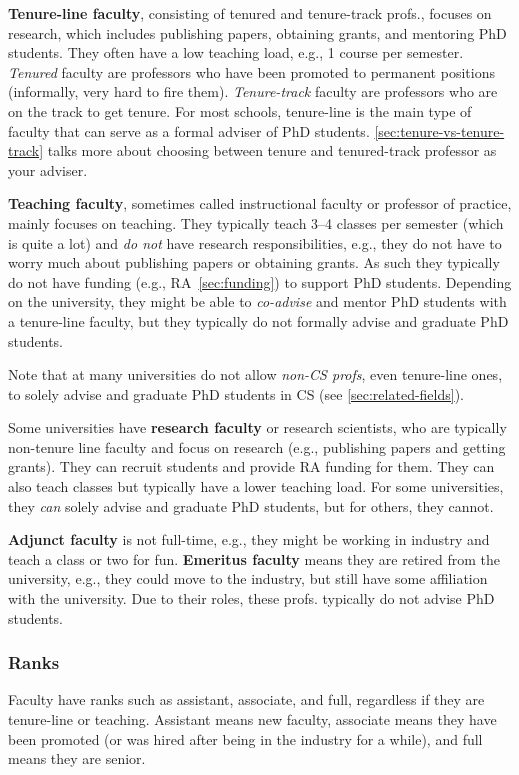 \documentclass[oneside,11pt,dvipsnames]{book}
\begin{document}
\textbf{Tenure-line faculty}, consisting of tenured and tenure-track profs., focuses on research, which includes publishing papers, obtaining grants, and mentoring PhD students.  They often have a low teaching load, e.g., 1 course per semester. \emph{Tenured} faculty are professors who have been promoted to permanent positions (informally, very hard to fire them).  \emph{Tenure-track} faculty are professors who are on the track to get tenure.  For most schools, tenure-line is the main type of faculty that can serve as a formal adviser of PhD students. \autoref{sec:tenure-vs-tenure-track} talks more about choosing between tenure and tenured-track professor as your adviser.

\textbf{Teaching faculty}, sometimes called instructional faculty or professor of practice, mainly focuses on teaching. They typically teach 3--4 classes per semester (which is quite a lot) and \emph{do not} have research responsibilities, e.g., they do not have to worry much about publishing papers or obtaining grants. As such they typically do not have funding (e.g., RA~\autoref{sec:funding}) to support PhD students.
Depending on the university, they might be able to \emph{co-advise} and mentor PhD students with a tenure-line faculty, but they typically do not formally advise and graduate PhD students.

Note that at many universities do not allow \emph{non-CS profs}, even tenure-line ones, to solely advise and graduate PhD students in CS (see \autoref{sec:related-fields}). 

Some universities have \textbf{research faculty} or research scientists, who are typically non-tenure line faculty and focus on research (e.g., publishing papers and getting grants). 
They can recruit students and provide RA funding for them. 
They can also teach classes but typically have a lower teaching load.
For some universities, they \emph{can} solely advise and graduate PhD students, but for others, they cannot. 

\textbf{Adjunct faculty} is not full-time, e.g., they might be working in industry and teach a class or two for fun. \textbf{Emeritus faculty} means they are retired from the university, e.g., they could move to the industry, but still have some affiliation with the university.   Due to their roles, these profs. typically do not advise PhD students.


\subsubsection{Ranks} Faculty have ranks such as assistant, associate, and full, regardless if they are tenure-line or teaching.  Assistant means new faculty, associate means they have been promoted (or was hired after being in the industry for a while), and full means they are senior. 
\end{document}
